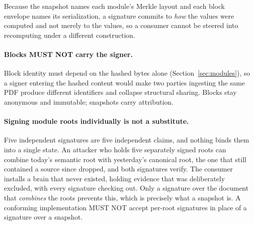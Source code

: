 \documentclass[11pt,a4paper]{article}
\begin{document}
Because the snapshot names each module's Merkle layout and each block envelope
names its serialization, a signature commits to \emph{how} the values were
computed and not merely to the values, so a consumer cannot be steered into
recomputing under a different construction.

\paragraph{Blocks MUST NOT carry the signer.}
Block identity must depend on the hashed bytes alone
(Section~\ref{sec:modules}), so a signer entering the hashed content would
make two parties ingesting the same PDF produce different identifiers and
collapse structural sharing. Blocks stay anonymous and immutable; snapshots
carry attribution.

\paragraph{Signing module roots individually is not a substitute.}
Five independent signatures are five independent claims, and nothing binds them
into a single state. An attacker who holds five separately signed roots can
combine today's semantic root with yesterday's canonical root, the one that
still contained a source since dropped, and both signatures verify. The consumer
installs a brain that never existed, holding evidence that was deliberately
excluded, with every signature checking out. Only a signature over the document
that \emph{combines} the roots prevents this, which is precisely what a snapshot
is. A conforming implementation MUST NOT accept per-root signatures in place of
a signature over a snapshot.
\end{document}
